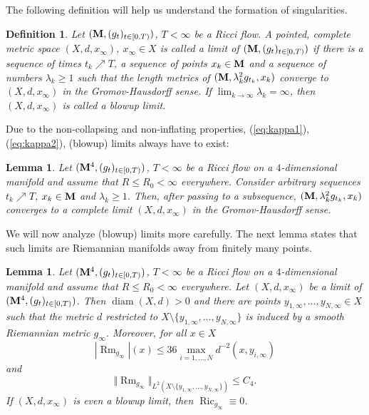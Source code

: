 \documentclass[11pt]{amsart}
\numberwithin{equation}{section}
\newtheorem{definition}[theorem]{Definition}
\newtheorem{lemma}[theorem]{Lemma}
\def\M{{\bf M}}
\DeclareMathOperator{\diam}{diam}
\DeclareMathOperator{\Ric}{Ric}
\DeclareMathOperator{\Rm}{Rm}
\numberwithin{equation}{section}
\begin{document}
The following definition will help us understand the formation of singularities.

\begin{definition}
Let $(\M, (g_t)_{t \in [0,T)})$, $T < \infty$ be a Ricci flow.
A pointed, complete metric space $(X, d, x_\infty)$, $x_\infty \in X$ is called a \emph{limit} of $(\M, (g_t)_{t \in [0,T)})$ if there is a sequence of times $t_k \nearrow T$, a sequence of points $x_k \in \M$ and a sequence of numbers $\lambda_k \geq 1$ such that the length metrics of $(\M, \lambda_k^2 g_{t_k}, x_k)$ converge to $(X, d, x_\infty)$ in the Gromov-Hausdorff sense.
If $\lim_{k \to \infty} \lambda_k = \infty$, then $(X, d, x_\infty)$ is called a \emph{blowup limit}.
\end{definition}

Due to the non-collapsing and non-inflating properties, (\ref{eq:kappa1}), (\ref{eq:kappa2}), (blowup) limits always have to exist:

\begin{lemma}
Let $(\M^4, (g_t)_{t \in [0,T)})$, $T < \infty$ be a Ricci flow on a $4$-dimensional manifold and assume that $R \leq R_0 < \infty$ everywhere.
Consider arbitrary sequences $t_k \nearrow T$, $x_k \in \M$ and $\lambda_k \geq 1$.
Then, after passing to a subsequence, $(\M, \lambda_k^2 g_{t_k}, x_k)$ converges to a complete limit $(X, d, x_\infty)$ in the Gromov-Hausdorff sense.
\end{lemma}

We will now analyze (blowup) limits more carefully.
The next lemma states that such limits are Riemannian manifolds away from finitely many points.

\begin{lemma} \label{Lem:Xsmoothonreg}
Let $(\M^4, (g_t)_{t \in [0,T)})$, $T < \infty$ be a Ricci flow on a $4$-dimensional manifold and assume that $R \leq R_0 < \infty$ everywhere.
Let $(X, d, x_\infty)$ be a limit of $(\M^4, (g_t)_{t \in [0,T)})$.
Then $\diam (X, d) > 0$ and there are points $y_{1,\infty}, \ldots, y_{N,\infty} \in X$ such that the metric $d$ restricted to $X \setminus \{ y_{1,\infty}, \ldots, y_{N,\infty} \}$ is induced by a smooth Riemannian metric $g_\infty$.
Moreover, for all $x \in X$
\[ |{\Rm}_{g_\infty} |(x) \leq 36 \max_{i = 1, \ldots, N} d^{-2} (x, y_{i,\infty}) \]
and
\begin{equation} \label{eq:RmXL2}
 \Vert {\Rm}_{g_\infty} \Vert_{L^2(X \setminus \{ y_{1,\infty}, \ldots, y_{N,\infty} \})} \leq C_4.
\end{equation}
If $(X, d, x_\infty)$ is even a blowup limit, then $\Ric_{g_\infty} \equiv 0$.
\end{lemma}
\end{document}
